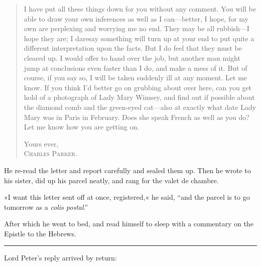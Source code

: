 \begin{quote}

I have put all these things down for you without any comment. You will be able to draw your own inferences as well as I can\allowbreak---\allowbreak better, I hope, for my own are perplexing and worrying me no end. They may be all rubbish\allowbreak---\allowbreak I hope they are; I daresay something will turn up at your end to put quite a different interpretation upon the facts. But I do feel that they must be cleared up. I would offer to hand over the job, but another man might jump at conclusions even faster than I do, and make a mess of it. But of course, if you say so, I will be taken suddenly ill at any moment. Let me know. If you think I'd better go on grubbing about over here, can you get hold of a photograph of Lady Mary Wimsey, and find out if possible about the diamond comb and the green-eyed cat\allowbreak---\allowbreak also at exactly what date Lady Mary was in Paris in February. Does she speak French as well as you do? Let me know how you are getting on.

\begin{flushright}
Yours ever,\\
\textsc{Charles Parker.}
\end{flushright}
\end{quote}


He re-read the letter and report carefully and sealed them up. Then he wrote to his sister, did up his parcel neatly, and rang for the valet de chambre.

»I want this letter sent off at once, registered,« he said, \enquote{and the parcel is to go tomorrow as a \textit{colis postal}.}

After which he went to bed, and read himself to sleep with a commentary on the Epistle to the Hebrews.

\noindent\hfil\rule{0.5\textwidth}{.4pt}\hfil

Lord Peter's reply arrived by return:

